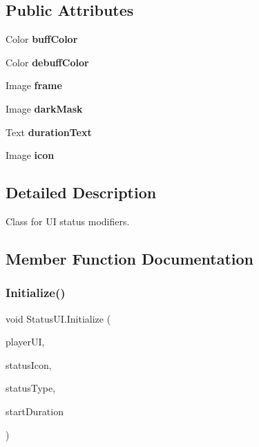 \subsection*{Public Attributes}
\begin{DoxyCompactItemize}
\item 
\hypertarget{class_status_u_i_a86e1884329ee82f8fa72ce4647547756}{}\label{class_status_u_i_a86e1884329ee82f8fa72ce4647547756} 
Color {\bfseries buff\+Color}
\item 
\hypertarget{class_status_u_i_a7558d4f0a7e8d673cb120226caad03cc}{}\label{class_status_u_i_a7558d4f0a7e8d673cb120226caad03cc} 
Color {\bfseries debuff\+Color}
\item 
\hypertarget{class_status_u_i_a9e2d935b8d63d7ecfa4cfae28f5ac3b5}{}\label{class_status_u_i_a9e2d935b8d63d7ecfa4cfae28f5ac3b5} 
Image {\bfseries frame}
\item 
\hypertarget{class_status_u_i_aeb7f005871636deac96977073dd44d33}{}\label{class_status_u_i_aeb7f005871636deac96977073dd44d33} 
Image {\bfseries dark\+Mask}
\item 
\hypertarget{class_status_u_i_a943e15c9d39d95b28293ea2d4db883d7}{}\label{class_status_u_i_a943e15c9d39d95b28293ea2d4db883d7} 
Text {\bfseries duration\+Text}
\item 
\hypertarget{class_status_u_i_a308179b43ca5737fcc9d6f83e9f765fc}{}\label{class_status_u_i_a308179b43ca5737fcc9d6f83e9f765fc} 
Image {\bfseries icon}
\end{DoxyCompactItemize}


\subsection{Detailed Description}
Class for UI status modifiers. 



\subsection{Member Function Documentation}
\hypertarget{class_status_u_i_abb72528e52d4f970451487847ea1e581}{}\label{class_status_u_i_abb72528e52d4f970451487847ea1e581} 
\subsubsection{\texorpdfstring{Initialize()}{Initialize()}}
{\footnotesize\ttfamily void Status\+U\+I.\+Initialize (\begin{DoxyParamCaption}\item[{\hyperlink{class_player_u_i_handler}{Player\+U\+I\+Handler}}]{player\+UI,  }\item[{Sprite}]{status\+Icon,  }\item[{Status\+Type}]{status\+Type,  }\item[{float}]{start\+Duration }\end{DoxyParamCaption})}



